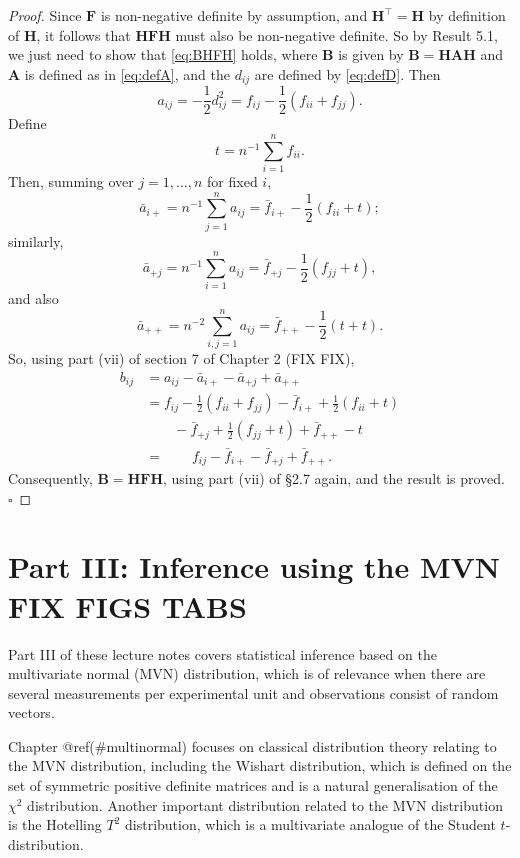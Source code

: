 \documentclass[]{book}
\theoremstyle{definition}
\theoremstyle{definition}
\theoremstyle{definition}
\theoremstyle{remark}
\begin{document}
\begin{proof}
{}Since \(\boldsymbol F\) is non-negative definite by assumption, and \(\boldsymbol H^\top =\boldsymbol H\) by definition of \(\boldsymbol H\), it follows that \(\boldsymbol H\boldsymbol F\boldsymbol H\) must also be non-negative definite. So by Result 5.1, we just need to show that \eqref{eq:BHFH} holds, where \(\boldsymbol B\) is given by \(\boldsymbol B=\boldsymbol H\boldsymbol A\boldsymbol H\) and \(\boldsymbol A\) is defined as in \eqref{eq:defA}, and the \(d_{ij}\) are defined by \eqref{eq:defD}. Then
\[
a_{ij}=-\frac{1}{2}d_{ij}^2 =f_{ij}-\frac{1}{2}(f_{ii}+f_{jj}).
\]
Define
\[
t=n^{-1}\sum_{i=1}^n f_{ii}.
\]
Then, summing over \(j=1, \ldots , n\) for fixed \(i\),
\[
\bar{a}_{i+}=n^{-1}\sum_{j=1}^n a_{ij} = \bar{f}_{i+}-\frac{1}{2}(f_{ii}+t);
\]
similarly,
\[
\bar{a}_{+j}=n^{-1}\sum_{i=1}^n a_{ij}=\bar{f}_{+j}-\frac{1}{2}(f_{jj}+t),
\]
and also
\[
\bar{a}_{++}=n^{-2}\sum_{i,j=1}^n a_{ij}=\bar{f}_{++}-\frac{1}{2}(t+t).
\]
So, using part (vii) of section 7 of Chapter 2 (FIX FIX),
\begin{align*} 
b_{ij}&=a_{ij}-\bar{a}_{i+}-\bar{a}_{+j}+\bar{a}_{++}\\
&=f_{ij}-\frac{1}{2}(f_{ii}+f_{jj})-\bar{f}_{i+}+\frac{1}{2}(f_{ii}+t)\\
& \qquad -\bar{f}_{+j}+\frac{1}{2}(f_{jj}+t) +\bar{f}_{++}-t\\
& =\qquad f_{ij}-\bar{f}_{i+}-\bar{f}_{+j}+\bar{f}_{++}.
\end{align*}
Consequently, \(\boldsymbol B=\boldsymbol H\boldsymbol F\boldsymbol H\), using part (vii) of \S 2.7 again, and the result is proved.
\hfill\(\square\)
\end{proof}

\hypertarget{part-iii-inference-using-the-mvn-fix-figs-tabs}{%
\chapter*{Part III: Inference using the MVN FIX FIGS TABS}\label{part-iii-inference-using-the-mvn-fix-figs-tabs}}

Part III of these lecture notes covers statistical inference based on the multivariate normal (MVN) distribution, which is of relevance when there are several measurements per experimental unit and observations consist of random vectors.

Chapter @ref(\#multinormal) focuses on classical distribution theory relating to the MVN distribution, including the Wishart distribution, which is defined on the set of symmetric positive definite matrices and is a natural generalisation of the \(\chi^2\) distribution. Another important distribution related to the MVN distribution is the Hotelling \(T^2\) distribution, which is a multivariate analogue of the Student \(t\)-distribution.
\end{document}
